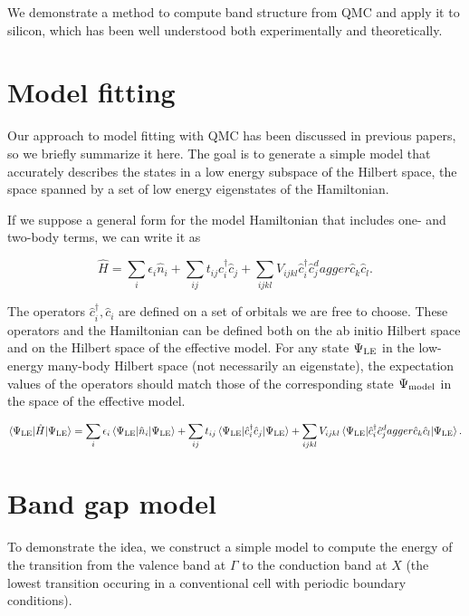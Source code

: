 We demonstrate a method to compute band structure from QMC and apply it to silicon, which has been well understood both experimentally and theoretically.

\section{Model fitting}

Our approach to model fitting with QMC has been discussed in previous papers, so we briefly summarize it here.
The goal is to generate a simple model that accurately describes the states in a low energy subspace of the Hilbert space, the space spanned by a set of low energy eigenstates of the Hamiltonian.

If we suppose a general form for the model Hamiltonian that includes one- and two-body terms, we can write it as

\begin{equation}
\hat{H} = \sum_i \epsilon_i \hat{n}_i + \sum_{ij} t_{ij} \hat{c}_i^\dagger \hat{c}_j + \sum_{ijkl} V_{ijkl} \hat{c}_i^\dagger \hat{c}_j^dagger \hat{c}_k \hat{c}_l.
\end{equation}

The operators $\hat{c}_i^\dagger, \hat{c}_i$ are defined on a set of orbitals we are free to choose.
These operators and the Hamiltonian can be defined both on the ab initio Hilbert space and on the Hilbert space of the effective model.
For any state $\Psi_{\rm LE}$ in the low-energy many-body Hilbert space (not necessarily an eigenstate), the expectation values of the operators should match those of the corresponding state $\Psi_{\rm model}$ in the space of the effective model.

\begin{equation}
\braket{\Psi_{\rm LE} | \hat{H} | \Psi_{\rm LE}} = 
\sum_i \epsilon_i \braket{\Psi_{\rm LE} | \hat{n}_i | \Psi_{\rm LE}} + 
\sum_{ij} t_{ij} \braket{\Psi_{\rm LE} | \hat{c}_i^\dagger \hat{c}_j | \Psi_{\rm LE}} + 
\sum_{ijkl} V_{ijkl} \braket{ \Psi_{\rm LE} | \hat{c}_i^\dagger \hat{c}_j^dagger \hat{c}_k \hat{c}_l | \Psi_{\rm LE}}.
\end{equation}



\section{Band gap model}

To demonstrate the idea, we construct a simple model to compute the energy of the transition from the valence band at $\Gamma$ to the conduction band at $X$ (the lowest transition occuring in a conventional cell with periodic boundary conditions).

